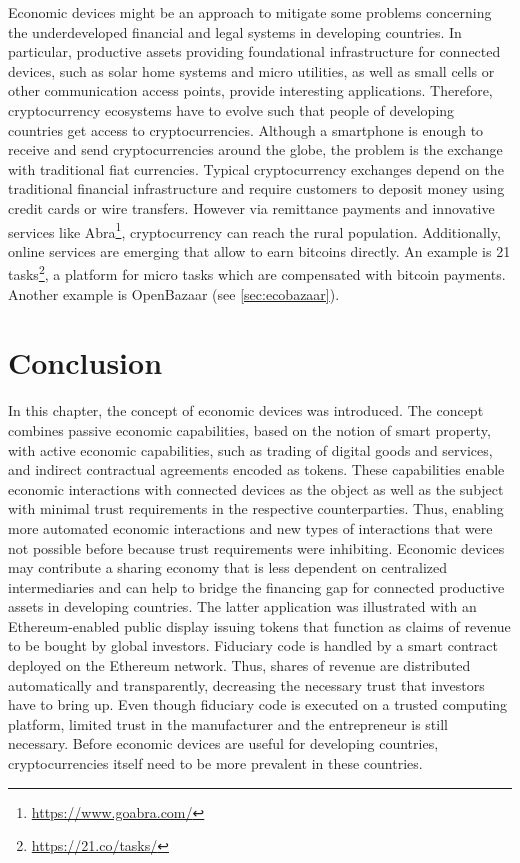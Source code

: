 Economic devices might be an approach to mitigate some problems concerning the underdeveloped financial and legal systems in developing countries. In particular, productive assets providing foundational infrastructure for connected devices, such as solar home systems and micro utilities, as well as small cells or other communication access points, provide interesting applications. Therefore, cryptocurrency ecosystems have to evolve such that people of developing countries get access to cryptocurrencies. Although a smartphone is enough to receive and send cryptocurrencies around the globe, the problem is the exchange with traditional fiat currencies. Typical cryptocurrency exchanges depend on the traditional financial infrastructure and require customers to deposit money using credit cards or wire transfers. However via remittance payments and innovative services like Abra\footnote{\url{https://www.goabra.com/}}, cryptocurrency can reach the rural population. Additionally, online services are emerging that allow to earn bitcoins directly. An example is 21 tasks\footnote{\url{https://21.co/tasks/}}, a platform for micro tasks which are compensated with bitcoin payments. Another example is OpenBazaar (see \ref{sec:ecobazaar}). 


\section{Conclusion}

In this chapter, the concept of economic devices was introduced. The concept combines passive economic capabilities, based on the notion of smart property, with active economic capabilities, such as trading of digital goods and services, and indirect contractual agreements encoded as tokens. These capabilities enable economic interactions with connected devices as the object as well as the subject with minimal trust requirements in the respective counterparties. Thus, enabling more automated economic interactions and new types of interactions that were not possible before because trust requirements were inhibiting. Economic devices may contribute a sharing economy that is less dependent on centralized intermediaries and can help to bridge the financing gap for connected productive assets in developing countries. The latter application was illustrated with an Ethereum-enabled public display issuing tokens that function as claims of revenue to be bought by global investors. Fiduciary code is handled by a smart contract deployed on the Ethereum network. Thus, shares of revenue are distributed automatically and transparently, decreasing the necessary trust that investors have to bring up. Even though fiduciary code is executed on a trusted computing platform, limited trust in the manufacturer and the entrepreneur is still necessary. Before economic devices are useful for developing countries, cryptocurrencies itself need to be more prevalent in these countries.